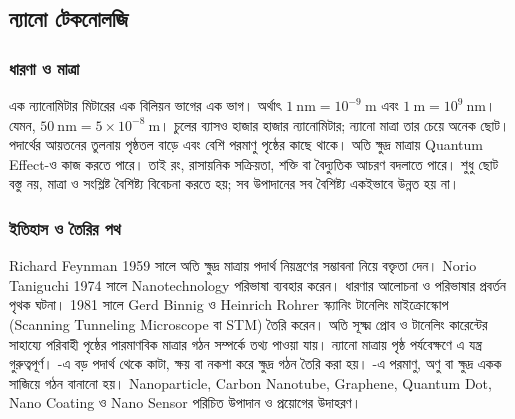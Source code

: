 \subsection{ন্যানো টেকনোলজি}
\label{sec:ch1-nano}
\subsubsection{ধারণা ও মাত্রা}
এক ন্যানোমিটার মিটারের এক বিলিয়ন ভাগের এক ভাগ। অর্থাৎ $1\ \mathrm{nm}=10^{-9}\ \mathrm{m}$ এবং $1\ \mathrm{m}=10^9\ \mathrm{nm}$। যেমন, $50\ \mathrm{nm}=5\times10^{-8}\ \mathrm{m}$। চুলের ব্যাসও হাজার হাজার ন্যানোমিটার; ন্যানো মাত্রা তার চেয়ে অনেক ছোট।
পদার্থের আয়তনের তুলনায় পৃষ্ঠতল বাড়ে এবং বেশি পরমাণু পৃষ্ঠের কাছে থাকে। অতি ক্ষুদ্র মাত্রায় Quantum Effect-ও কাজ করতে পারে। তাই রং, রাসায়নিক সক্রিয়তা, শক্তি বা বৈদ্যুতিক আচরণ বদলাতে পারে। শুধু ছোট বস্তু নয়, মাত্রা ও সংশ্লিষ্ট বৈশিষ্ট্য বিবেচনা করতে হয়; সব উপাদানের সব বৈশিষ্ট্য একইভাবে উন্নত হয় না।
\subsubsection{ইতিহাস ও তৈরির পথ}
Richard Feynman 1959 সালে অতি ক্ষুদ্র মাত্রায় পদার্থ নিয়ন্ত্রণের সম্ভাবনা নিয়ে বক্তৃতা দেন। Norio Taniguchi 1974 সালে Nanotechnology পরিভাষা ব্যবহার করেন। ধারণার আলোচনা ও পরিভাষার প্রবর্তন পৃথক ঘটনা। 1981 সালে Gerd Binnig ও Heinrich Rohrer স্ক্যানিং টানেলিং মাইক্রোস্কোপ (Scanning Tunneling Microscope বা STM) তৈরি করেন। অতি সূক্ষ্ম প্রোব ও টানেলিং কারেন্টের সাহায্যে পরিবাহী পৃষ্ঠের পারমাণবিক মাত্রার গঠন সম্পর্কে তথ্য পাওয়া যায়। ন্যানো মাত্রায় পৃষ্ঠ পর্যবেক্ষণে এ যন্ত্র গুরুত্বপূর্ণ।
-এ বড় পদার্থ থেকে কাটা, ক্ষয় বা নকশা করে ক্ষুদ্র গঠন তৈরি করা হয়। -এ পরমাণু, অণু বা ক্ষুদ্র একক সাজিয়ে গঠন বানানো হয়। Nanoparticle, Carbon Nanotube, Graphene, Quantum Dot, Nano Coating ও Nano Sensor পরিচিত উপাদান ও প্রয়োগের উদাহরণ।
